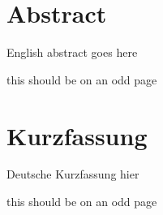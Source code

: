 \setlength{\parskip}{0.7em} %

\chapter*{Abstract}  
English abstract goes here

this should be on an odd page

\blindtext \blindtext \blindtext \blindtext \blindtext \blindtext \blindtext \blindtext
\blindtext
\chapter*{Kurzfassung}  
Deutsche Kurzfassung hier

this should be on an odd page

\blindtext \blindtext \blindtext \blindtext \blindtext \blindtext \blindtext \blindtext